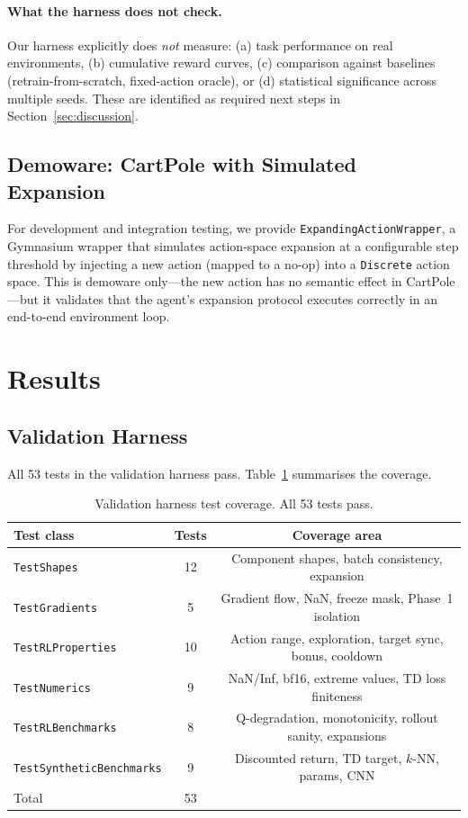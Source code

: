 \documentclass{article}
\begin{document}
\paragraph{What the harness does not check.}
Our harness explicitly does \emph{not} measure: (a) task performance on real
environments, (b) cumulative reward curves, (c) comparison against baselines
(retrain-from-scratch, fixed-action oracle), or (d) statistical significance
across multiple seeds. These are identified as required next steps in
Section~\ref{sec:discussion}.

\subsection{Demoware: CartPole with Simulated Expansion}

For development and integration testing, we provide
\texttt{ExpandingActionWrapper}, a Gymnasium wrapper that simulates action-space
expansion at a configurable step threshold by injecting a new action (mapped to
a no-op) into a \texttt{Discrete} action space. This is demoware only---the new
action has no semantic effect in CartPole---but it validates that the agent's
expansion protocol executes correctly in an end-to-end environment loop.


\section{Results}
\label{sec:results}

\subsection{Validation Harness}

All 53 tests in the validation harness pass. Table~\ref{tab:tests} summarises
the coverage.

\begin{table}[h]
  \centering
  \caption{Validation harness test coverage. All 53 tests pass.}
  \label{tab:tests}
  \begin{tabular}{lcc}
    \toprule
    \textbf{Test class} & \textbf{Tests} & \textbf{Coverage area} \\
    \midrule
    \texttt{TestShapes} & 12 & Component shapes, batch consistency, expansion \\
    \texttt{TestGradients} & 5 & Gradient flow, NaN, freeze mask, Phase~1 isolation \\
    \texttt{TestRLProperties} & 10 & Action range, exploration, target sync, bonus, cooldown \\
    \texttt{TestNumerics} & 9 & NaN/Inf, bf16, extreme values, TD loss finiteness \\
    \texttt{TestRLBenchmarks} & 8 & Q-degradation, monotonicity, rollout sanity, expansions \\
    \texttt{TestSyntheticBenchmarks} & 9 & Discounted return, TD target, $k$-NN, params, CNN \\
    \midrule
    Total & 53 & \\
    \bottomrule
  \end{tabular}
\end{table}
\end{document}
